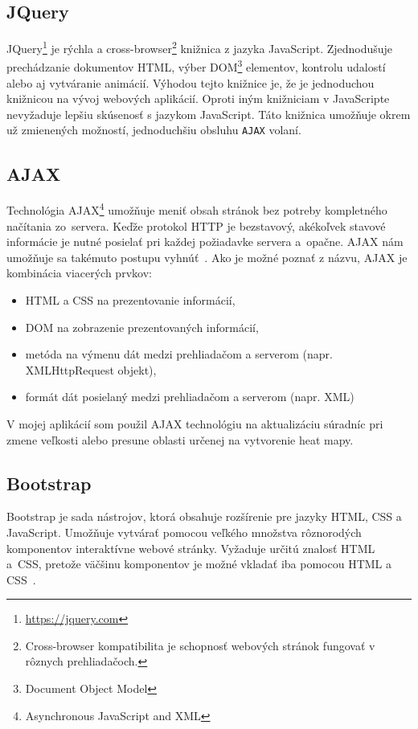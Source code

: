 \subsection{JQuery}
JQuery\footnote{\url{https://jquery.com}} je rýchla a cross-browser\footnote{Cross-browser kompatibilita je schopnosť webových stránok fungovať v rôznych prehliadačoch.} knižnica z jazyka JavaScript. Zjednodušuje prechádzanie dokumentov HTML, výber DOM\footnote{Document Object Model} elementov, kontrolu udalostí alebo aj vytváranie animácií. Výhodou tejto knižnice je, že je jednoduchou knižnicou na vývoj webových aplikácií. Oproti iným knižniciam v JavaScripte nevyžaduje lepšiu skúsenosť s jazykom JavaScript. Táto knižnica umožňuje okrem už zmienených možností, jednoduchšiu obsluhu \texttt{AJAX} volaní.

\subsection{AJAX}
Technológia AJAX\footnote{Asynchronous JavaScript and XML} umožňuje meniť obsah stránok bez potreby kompletného načítania zo~servera. Keďže protokol HTTP je bezstavový, akékoľvek stavové informácie je nutné posielať pri každej požiadavke servera a~opačne. AJAX nám umožňuje sa takémuto postupu vyhnúť~\cite{lacko2008ajax}. Ako je možné poznať z názvu, AJAX je kombinácia viacerých prvkov:
\begin{itemize}
    \item HTML a CSS na prezentovanie informácií,
    \item DOM na zobrazenie prezentovaných informácií,
    \item metóda na výmenu dát medzi prehliadačom a serverom (napr. XMLHttpRequest objekt),
    \item formát dát posielaný medzi prehliadačom a serverom (napr. XML)
\end{itemize}

V mojej aplikácií som použil AJAX technológiu na aktualizáciu súradníc pri zmene veľkosti alebo presune oblasti určenej na vytvorenie heat mapy.

\subsection{Bootstrap}
Bootstrap je sada nástrojov, ktorá obsahuje rozšírenie pre jazyky HTML, CSS a JavaScript. Umožňuje vytvárať pomocou veľkého množstva rôznorodých komponentov interaktívne webové stránky. Vyžaduje určitú znalosť HTML a~CSS, pretože väčšinu komponentov je možné vkladať iba pomocou HTML a CSS~\cite{bootstrap}.


